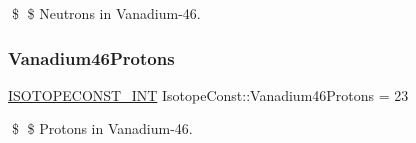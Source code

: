 \$ \$ Neutrons in Vanadium-\/46. \mbox{\label{group___isotope_const-_vanadium-_v46_ga07204aeb14a0b9ec0858920279df0d4c}} 
\subsubsection{\texorpdfstring{Vanadium46\+Protons}{Vanadium46Protons}}
{\footnotesize\ttfamily \mbox{\hyperlink{group___isotope_const-_macros_ga5f18360b3e99483a35c32d789e62621c}{I\+S\+O\+T\+O\+P\+E\+C\+O\+N\+S\+T\+\_\+\+I\+NT}} Isotope\+Const\+::\+Vanadium46\+Protons = 23}

\$ \$ Protons in Vanadium-\/46. 